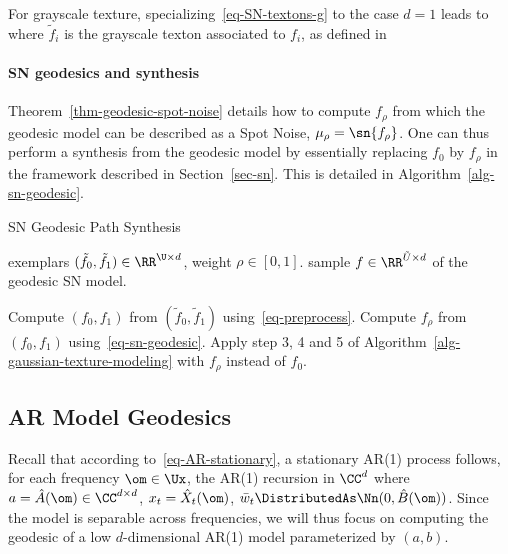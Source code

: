 For grayscale texture, specializing~\eqref{eq-SN-textons-g} to the case $d=1$ leads to 
where $\tilde f_i$ is the grayscale texton associated to $f_i$, as defined in~\cite{} 


\paragraph{SN geodesics and synthesis} Theorem~\ref{thm-geodesic-spot-noise} details how to compute $f_\rho$ from which the geodesic model can be described as a Spot Noise, $\mu_\rho = \sn{f_\rho}$. One can thus perform a synthesis from the geodesic model by essentially replacing $f_0$ by $f_\rho$ in the framework described in Section~\ref{sec-sn}. This is detailed in Algorithm~\ref{alg-sn-geodesic}.


\begin{algorithm}[ht!]
\caption{SN Geodesic Path Synthesis}
\label{alg-sn-geodesic}
\begin{algorithmic}[1]
\Require exemplars $(\tilde f_0, \tilde f_1) \in \RR^{\U \times d}$, weight $\rho \in [0,1]$.
\Ensure sample $f \in \RR^{\tilde U \times d}$ of the geodesic SN model.
\Statex
\begin{enumerate}
	 Compute $(f_0,f_1)$ from $(\tilde f_0, \tilde f_1)$ 
			using~\eqref{eq-preprocess}.
	 Compute $f_\rho$ from $(f_0,f_1)$ using~\eqref{eq-sn-geodesic}.
	 Apply step 3, 4 and 5 of Algorithm~\ref{alg-gaussian-texture-modeling}
		with $f_\rho$ instead of $f_0$. 
\end{enumerate}
\end{algorithmic}
\end{algorithm}



\subsection{AR Model Geodesics}
\label{subsec-ar-geodesic}

Recall that according to~\eqref{eq-AR-stationary}, a stationary AR(1) process follows, for each frequency $\om \in \Ux$, the AR(1) recursion in $\CC^d$
where $a=\hat A(\om) \in \CC^{d \times d}$, $x_t = \hat X_t(\om)$, $\bar w_t \DistributedAs \Nn(0,\hat B(\om))$. Since the model is separable across frequencies, we will thus focus on computing the geodesic of a low $d$-dimensional AR(1) model parameterized by $(a,b)$.

